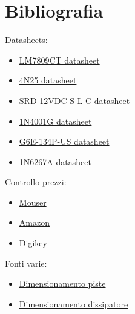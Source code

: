 \documentclass[12pt]{article}
\begin{document}
\section{Bibliografia}
   \label{sec:bibliografia}
   Datasheets:
   \begin{itemize}
       \item \href{https://datasheetspdf.com/pdf/766811/ThinkiSemiconductor/LM78XX/1}{LM7809CT datasheet}
       \item \href{https://www.alldatasheet.com/datasheet-pdf/pdf/2846/MOTOROLA/4N25.html}{4N25 datasheet}
       \item \href{https://www.alldatasheet.com/datasheet-pdf/pdf/1131947/SONGLERELAY/SRD12VDCSLC.html}{SRD-12VDC-S L-C datasheet}
       \item \href{https://it.farnell.com/on-semiconductor/1n4001g/diodo-standard-1a-do-41/dp/1458986?gclid=CjwKCAjwqcKFBhAhEiwAfEr7zUiXu7byYKAv4I9jzqX1HOrYwDHbs8iKbdpKXM1QnqVZ_xLJMfnMjxoCd9kQAvD_BwE&mckv=s_dc|pcrid|522005845083|kword|1n4001g|match|p|plid||slid||product||pgrid|122762829255|ptaid|kwd-10795764537|&CMP=KNC-GIT-GEN-SKU-MDC-Semiconductors}{1N4001G datasheet}
       \item \href{https://omronfs.omron.com/en_US/ecb/products/pdf/en-g6e.pdf}{G6E-134P-US datasheet}
       \item \href{http://www.farnell.com/datasheets/2240125.pdf}{1N6267A datasheet}
       \end{itemize} 
       Controllo prezzi:
       \begin{itemize}
            \item \href{www.mouser.it}{Mouser}
             \item \href{amazon.it}{Amazon}
            \item \href{https://www.digikey.com/en/products/detail/omron-electronics-inc-emc-div/G6E-134P-ST-US-DC9/369175}{Digikey}
       \end{itemize} 
       Fonti varie:
       \begin{itemize}
         \item \href{https://www.vincenzov.net/tutorial/stampati/spessorepiste.htm}{Dimensionamento piste}
         \item \href{https://www.ne555.it/dissipatori-calore-calcolo-dimensioni/}{Dimensionamento dissipatore} \label{pistepng}
       \end{itemize}
\end{document}
